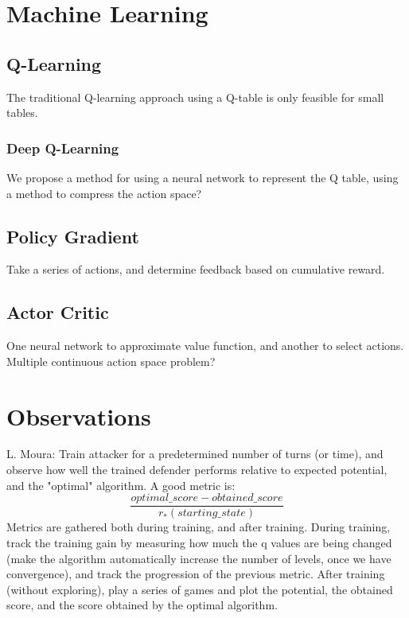 \documentclass{article}
\theoremstyle{plain}
\theoremstyle{definition}
\theoremstyle{remark}
\begin{document}
\section{Machine Learning}
\subsection{Q-Learning}
The traditional Q-learning approach using a Q-table is only feasible for small tables.
\subsubsection{Deep Q-Learning}
We propose a method for using a neural network to represent the Q table, using a method to compress the action space?

\subsection{Policy Gradient}
Take a series of actions, and determine feedback based on cumulative reward.
\subsection{Actor Critic}
One neural network to approximate value function, and another to select actions.
Multiple continuous action space problem?


\section{Observations}
L. Moura: Train attacker for a predetermined number of turns (or time), and observe how well the trained defender performs relative to expected potential, and the "optimal" algorithm. A good metric is:
\begin{equation*}
\frac{optimal\_score - obtained\_score}{r_{*}(starting\_state)}
\end{equation*}
Metrics are gathered both during training, and after training. During training, track the training gain by measuring how much the q values are being changed (make the algorithm automatically increase the number of levels, once we have convergence), and track the progression of the previous metric. After training (without exploring), play a series of games and plot the potential, the obtained score, and the score obtained by the optimal algorithm. \\\
\end{document}
